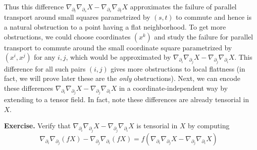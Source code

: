 \documentclass[
]{article}
\begin{document}
Thus this difference
\(\nabla_{\partial_t}\nabla_{\partial_s} X - \nabla_{\partial_s}\nabla_{\partial_t} X\)
approximates the failure of parallel transport around small squares
parametrized by \((s,t)\) to commute and hence is a natural obstruction
to a point having a flat neighborhood. To get more obstructions, we
could choose coordinates \((x^k)\) and study the failure for parallel
transport to commute around the small coordinate square parametrized by
\((x^i, x^j)\) for any \(i,j\), which would be approximated by
\(\nabla_{\partial_{i}}\nabla_{\partial_{j}} X - \nabla_{\partial_{j}}\nabla_{\partial_{i}} X\).
This difference for all such pairs \((i,j)\) gives more obstructions to
local flattness (in fact, we will prove later these are the \emph{only}
obstructions). Next, we can encode these differences
\(\nabla_{\partial_{i}}\nabla_{\partial_{j}} X - \nabla_{\partial_{j}}\nabla_{\partial_{i}} X\)
in a coordinate-independent way by extending to a tensor field. In fact,
note these differences are already tensorial in \(X\).

\textbf{Exercise.} Verify that
\(\nabla_{\partial_{i}}\nabla_{\partial_{j}} X - \nabla_{\partial_{j}}\nabla_{\partial_{i}} X\)
is tensorial in \(X\) by computing \[
    \nabla_{\partial_{i}}\nabla_{\partial_{j}} (fX) - \nabla_{\partial_{j}}\nabla_{\partial_{i}} (fX) 
    = f(\nabla_{\partial_{i}}\nabla_{\partial_{j}} X - \nabla_{\partial_{j}}\nabla_{\partial_{i}} X)
\]
\end{document}
